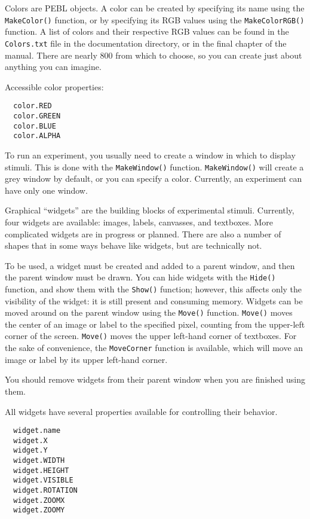 Colors are PEBL objects.  A color can be created by specifying its name 
using the \texttt{MakeColor()} function, or by specifying its RGB values using the \texttt{MakeColorRGB()} function. A list of colors and their respective RGB values can be found in the \texttt{Colors.txt} file in the documentation directory, or in the final chapter of the manual. There are nearly 800 from which to choose, so you can create 
just about anything you can imagine.

Accessible color properties:
\begin{verbatim}
  color.RED
  color.GREEN
  color.BLUE
  color.ALPHA
\end{verbatim}
 


To run an experiment, you usually need to create a window in which 
to display stimuli.  This is done with the \texttt{MakeWindow()} function. \texttt{MakeWindow()} will create a grey window by default, or you can 
specify a color.  Currently, an experiment can have only one window.



Graphical ``widgets'' are the building blocks of experimental stimuli. 
Currently, four widgets are available: images, labels, canvasses, and textboxes.  
More complicated widgets are in progress or planned.  There are also a number of shapes that in some ways behave like widgets, but are technically not.

To be used, a widget must be created and added to a parent window, and
then the parent window must be drawn.  You can hide widgets with the
\texttt{Hide()} function, and show them with the \texttt{Show()}
function; however, this affects only the visibility of the widget: it
is still present and consuming memory. Widgets can be moved around on
the parent window using the \texttt{Move()} function. \texttt{Move()}
moves the center of an image or label to the specified pixel, counting
from the upper-left corner of the screen. \texttt{Move()} moves the
upper left-hand corner of textboxes.  For the sake of convenience, the
\texttt{MoveCorner} function is available, which will move an image or
label by its upper left-hand corner.

You should remove widgets from their parent window when you are
finished using them.

All widgets have several properties available for controlling their
behavior.
\begin{verbatim}
  widget.name
  widget.X
  widget.Y
  widget.WIDTH
  widget.HEIGHT
  widget.VISIBLE
  widget.ROTATION
  widget.ZOOMX
  widget.ZOOMY

\end{verbatim}
 

